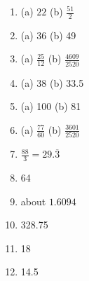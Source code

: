 \documentclass{article}
\begin{document}
\begin{multicols}{3}
\begin{enumerate}
    \item (a) $22$ \quad (b) $\frac{51}{2}$
    \item (a) 36 \quad (b) 49
    \item (a) $\frac{25}{12}$ \quad (b) $\frac{4609}{2520}$
\end{enumerate}
\end{multicols}
\vspace{10pt}
\begin{multicols}{3}
\begin{enumerate}   \setcounter{enumi}{3}
    \item (a) 38 \quad (b) 33.5
    \item (a) 100 \quad (b) 81
    \item (a) $\frac{77}{60}$ \quad (b) $\frac{3601}{2520}$
\end{enumerate}
\end{multicols}
\vspace{10pt}
\begin{multicols}{3}
\begin{enumerate}   \setcounter{enumi}{6}
    \item $\frac{88}{3} = 29.\overline{3}$
    \item 64
    \item about $1.6094$
\end{enumerate}
\end{multicols}
\vspace{10pt}
\begin{multicols}{3}
\begin{enumerate}   \setcounter{enumi}{9}
    \item 328.75
    \item 18
    \item 14.5
\end{enumerate}
\end{multicols}
\vspace{0.25in}
\end{document}
